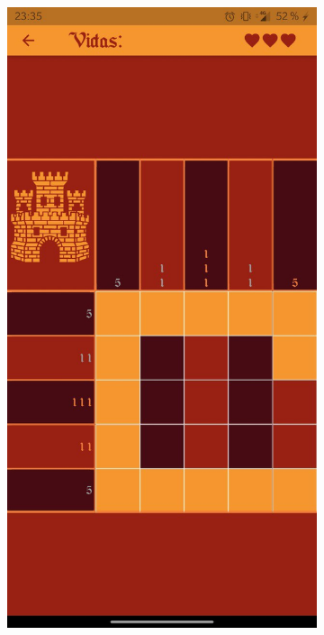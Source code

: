 \begin{figure}[H]
\begin{subfigure}[b]{0.22\linewidth}
        \includegraphics[width=\linewidth]{images/man14.jpeg}
      \end{subfigure}
    \begin{subfigure}[b]{0.22\linewidth}

\end{subfigure}
\end{figure}
